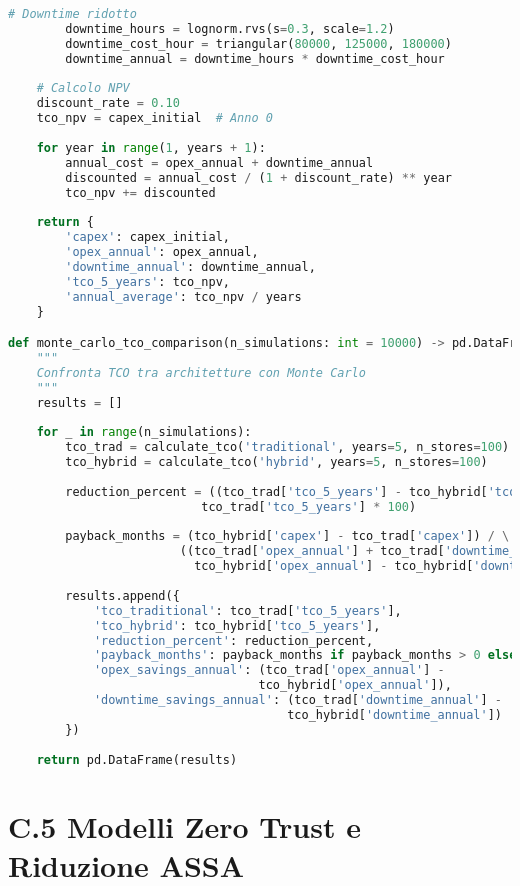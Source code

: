 \begin{lstlisting}[language=Python, caption=Calcolo TCO per Architetture Alternative]
        # Downtime ridotto
        downtime_hours = lognorm.rvs(s=0.3, scale=1.2)
        downtime_cost_hour = triangular(80000, 125000, 180000)
        downtime_annual = downtime_hours * downtime_cost_hour
    
    # Calcolo NPV
    discount_rate = 0.10
    tco_npv = capex_initial  # Anno 0
    
    for year in range(1, years + 1):
        annual_cost = opex_annual + downtime_annual
        discounted = annual_cost / (1 + discount_rate) ** year
        tco_npv += discounted
    
    return {
        'capex': capex_initial,
        'opex_annual': opex_annual,
        'downtime_annual': downtime_annual,
        'tco_5_years': tco_npv,
        'annual_average': tco_npv / years
    }

def monte_carlo_tco_comparison(n_simulations: int = 10000) -> pd.DataFrame:
    """
    Confronta TCO tra architetture con Monte Carlo
    """
    results = []
    
    for _ in range(n_simulations):
        tco_trad = calculate_tco('traditional', years=5, n_stores=100)
        tco_hybrid = calculate_tco('hybrid', years=5, n_stores=100)
        
        reduction_percent = ((tco_trad['tco_5_years'] - tco_hybrid['tco_5_years']) / 
                           tco_trad['tco_5_years'] * 100)
        
        payback_months = (tco_hybrid['capex'] - tco_trad['capex']) / \
                        ((tco_trad['opex_annual'] + tco_trad['downtime_annual'] - 
                          tco_hybrid['opex_annual'] - tco_hybrid['downtime_annual']) / 12)
        
        results.append({
            'tco_traditional': tco_trad['tco_5_years'],
            'tco_hybrid': tco_hybrid['tco_5_years'],
            'reduction_percent': reduction_percent,
            'payback_months': payback_months if payback_months > 0 else np.inf,
            'opex_savings_annual': (tco_trad['opex_annual'] - 
                                   tco_hybrid['opex_annual']),
            'downtime_savings_annual': (tco_trad['downtime_annual'] - 
                                       tco_hybrid['downtime_annual'])
        })
    
    return pd.DataFrame(results)
\end{lstlisting}

\section{C.5 Modelli Zero Trust e Riduzione ASSA}

